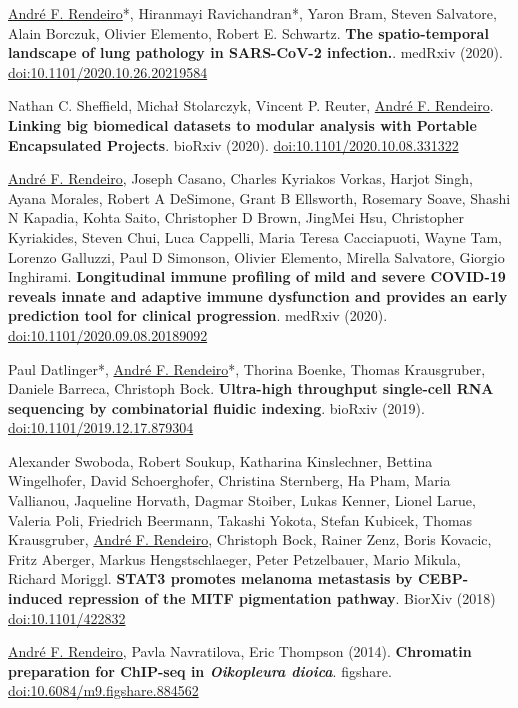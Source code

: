 \documentclass[11pt,a4paper,roman]{moderncv} %
\begin{document}
        \begin{etaremune}[leftmargin=1.0cm, itemindent=0pt, topsep=10pt, itemsep=2pt, partopsep=0pt, parsep=0pt]

        \item \underline{André F. Rendeiro}*, Hiranmayi Ravichandran*, Yaron Bram, Steven Salvatore, Alain Borczuk, Olivier Elemento, Robert E. Schwartz. \textbf{The spatio-temporal landscape of lung pathology in SARS-CoV-2 infection.}. medRxiv (2020). \href{https://dx.doi.org/10.1101/2020.10.26.20219584}{doi:10.1101/2020.10.26.20219584}

        \item Nathan C. Sheffield, Michał Stolarczyk, Vincent P. Reuter, \underline{André F. Rendeiro}. \textbf{Linking big biomedical datasets to modular analysis with Portable Encapsulated Projects}. bioRxiv (2020). \href{https://dx.doi.org/10.1101/2020.10.08.331322}{doi:10.1101/2020.10.08.331322}

        \item \underline{André F. Rendeiro}, Joseph Casano, Charles Kyriakos Vorkas, Harjot Singh, Ayana Morales, Robert A DeSimone, Grant B Ellsworth, Rosemary Soave, Shashi N Kapadia, Kohta Saito, Christopher D Brown, JingMei Hsu, Christopher Kyriakides, Steven Chui, Luca Cappelli, Maria Teresa Cacciapuoti, Wayne Tam, Lorenzo Galluzzi, Paul D Simonson, Olivier Elemento, Mirella Salvatore, Giorgio Inghirami. \textbf{Longitudinal immune profiling of mild and severe COVID-19 reveals innate and adaptive immune dysfunction and provides an early prediction tool for clinical progression}. medRxiv (2020). \href{https://dx.doi.org/10.1101/2020.09.08.20189092}{doi:10.1101/2020.09.08.20189092}

        \item Paul Datlinger*, \underline{André F. Rendeiro}*, Thorina Boenke, Thomas Krausgruber, Daniele Barreca, Christoph Bock. \textbf{Ultra-high throughput single-cell RNA sequencing by combinatorial fluidic indexing}. bioRxiv (2019). \href{https://dx.doi.org/10.1101/2019.12.17.879304}{doi:10.1101/2019.12.17.879304}
        \item Alexander Swoboda, Robert Soukup, Katharina Kinslechner, Bettina Wingelhofer, David Schoerghofer, Christina Sternberg, Ha Pham, Maria Vallianou, Jaqueline Horvath, Dagmar Stoiber, Lukas Kenner, Lionel Larue, Valeria Poli, Friedrich Beermann, Takashi Yokota, Stefan Kubicek, Thomas Krausgruber, \underline{André F. Rendeiro}, Christoph Bock, Rainer Zenz, Boris Kovacic, Fritz Aberger, Markus Hengstschlaeger, Peter Petzelbauer, Mario Mikula, Richard Moriggl. \textbf{STAT3 promotes melanoma metastasis by CEBP-induced repression of the MITF pigmentation pathway}. BiorXiv (2018) \href{https://dx.doi.org/ 10.1101/422832}{doi:10.1101/422832}

        \item \underline{André F. Rendeiro}, Pavla  Navratilova, Eric Thompson (2014). \textbf{Chromatin preparation for ChIP-seq in \textit{Oikopleura dioica}}. figshare. \href{https://doi.org/10.6084/m9.figshare.884562}{doi:10.6084/m9.figshare.884562}
        \end{etaremune}
\end{document}
